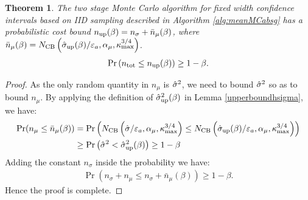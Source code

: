 \documentclass{iitthesis}
\newtheorem{theorem}{Theorem}[section]
\theoremstyle{definition}
\begin{document}
\begin{theorem}\label{thm:meanMCabsgcost}
The two stage Monte Carlo algorithm for fixed width confidence intervals based on IID sampling described in Algorithm \ref{alg:meanMCabsg} has a probabilistic cost bound $n_{\operatorname{up}}(\beta) =n_\sigma+\bar{n}_{\mu}(\beta)$, where $\bar{n}_{\mu}(\beta)=N_{\operatorname{CB}}\left(\hat{\sigma}_{\operatorname{up}}(\beta)/\varepsilon_a,\alpha_\mu, \kappa_{\max}^{3/4}\right)$.
\begin{align}
\Pr \left(n_{\operatorname{tot}} \leq n_{\operatorname{up}}(\beta)\right)  \geq 1-\beta.
\end{align}
\end{theorem}

\begin{proof}
As the only random quantity in $n_\mu$ is $\hat{\sigma}^2$, we need to bound $\hat{\sigma}^2$ so as to bound $n_{\mu}$.
 By applying the definition of $\hat{\sigma}_{\operatorname{up}}^2(\beta)$ in Lemma \ref{upperboundhsigma}, we have:
\begin{align*}
\Pr(n_{\mu} \leq \bar{n}_{\mu}(\beta))  &= \Pr\left (N_{\operatorname{CB}}\left(\hat{\sigma}/\varepsilon_a,\alpha_\mu, \kappa_{\max}^{3/4}\right) \leq N_{\operatorname{CB}}\left(\hat{\sigma}_{\operatorname{up}}(\beta)/\varepsilon_a,\alpha_\mu, \kappa_{\max}^{3/4}\right) \right)\\&
 \geq \Pr \left(\hat{\sigma}^2 < \hat{\sigma}_{\operatorname{up}}^2(\beta) \right) \geq 1-\beta
\end{align*}
Adding the constant $n_\sigma$ inside the probability we have:
\begin{align*}
 \Pr(n_\sigma+n_{\mu} \leq n_\sigma+\bar{n}_{\mu}(\beta))   \geq 1-\beta.
\end{align*}
Hence the proof is complete.
\end{proof}
\label{sec:numericalintegrationviaMC}
\end{document}
